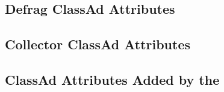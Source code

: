 \subsection*{\label{sec:Defrag-ClassAd-Attributes}Defrag ClassAd Attributes}


\subsection*{\label{sec:Collector-ClassAd-Attributes}Collector ClassAd Attributes}


\subsection*{\label{sec:Collector-Added-Attributes}ClassAd Attributes Added by the }

